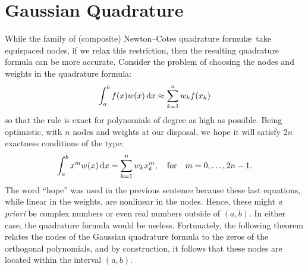 \section{Gaussian Quadrature}

While the family of (composite) Newton--Cotes quadrature formul\ae~take equispaced nodes, if we relax this restriction, then the resulting quadrature formula can be more accurate. Consider the problem of choosing the nodes and weights in the quadrature formula:
\[
\int_a^bf(x)w(x){\rm\,d} x \approx \sum_{k=1}^n w_kf(x_k)
\]
so that the rule is exact for polynomials of degree as high as possible. Being optimistic, with $n$ nodes and weights at our disposal, we hope it will satisfy $2n$ exactness conditions of the type:
\[
\int_a^b x^m w(x){\rm\,d} x = \sum_{k=1}^n w_k x_k^m,\quad{\rm for}\quad m=0,\ldots,2n-1.
\]
The word ``hope'' was used in the previous sentence because these last equations, while linear in the weights, are nonlinear in the nodes. Hence, these might {\em a priori} be complex numbers or even real numbers outside of $(a,b)$. In either case, the quadrature formula would be useless. Fortunately, the following theorem relates the nodes of the Gaussian quadrature formula to the zeros of the orthogonal polynomials, and by construction, it follows that these nodes are located within the interval $(a,b)$.

